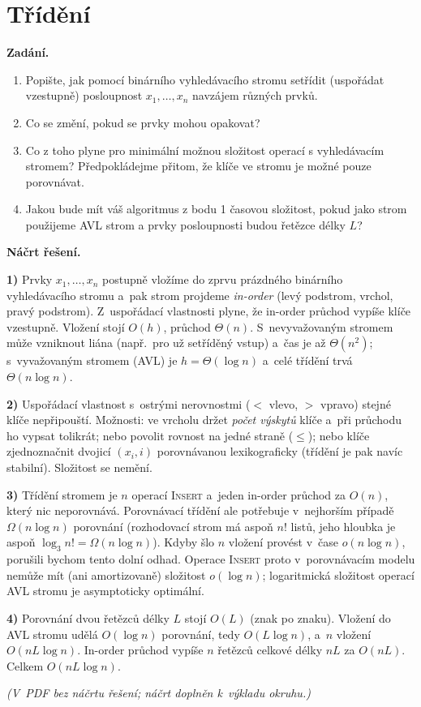 \section{Třídění}

\noindent\textbf{Zadání.}\par
\begin{enumerate}
\item Popište, jak pomocí binárního vyhledávacího stromu setřídit (uspořádat vzestupně)
  posloupnost $x_1, \dots, x_n$ navzájem různých prvků.
\item Co se změní, pokud se prvky mohou opakovat?
\item Co z toho plyne pro minimální možnou složitost operací s vyhledávacím stromem?
  Předpokládejme přitom, že klíče ve stromu je možné pouze porovnávat.
\item Jakou bude mít váš algoritmus z bodu 1 časovou složitost, pokud jako strom použijeme
  AVL strom a prvky posloupnosti budou řetězce délky $L$?
\end{enumerate}

\medskip
\noindent\textbf{Náčrt řešení.}\par
\textbf{1)} Prvky $x_1,\dots,x_n$ postupně vložíme do zprvu prázdného binárního
vyhledávacího stromu a~pak strom projdeme \emph{in-order} (levý podstrom, vrchol, pravý
podstrom). Z~uspořádací vlastnosti plyne, že in-order průchod vypíše klíče vzestupně.
Vložení stojí $O(h)$, průchod $\Theta(n)$. S~nevyvažovaným stromem může vzniknout liána
(např.\ pro už setříděný vstup) a~čas je až $\Theta(n^2)$; s~vyvažovaným stromem (AVL)
je $h=\Theta(\log n)$ a~celé třídění trvá $\Theta(n\log n)$.

\textbf{2)} Uspořádací vlastnost s~ostrými nerovnostmi ($<$ vlevo, $>$ vpravo) stejné
klíče nepřipouští. Možnosti: ve vrcholu držet \emph{počet výskytů} klíče a~při průchodu
ho vypsat tolikrát; nebo povolit rovnost na jedné straně ($\le$); nebo klíče
zjednoznačnit dvojicí $(x_i, i)$ porovnávanou lexikograficky (třídění je pak navíc
stabilní). Složitost se nemění.

\textbf{3)} Třídění stromem je $n$ operací \textsc{Insert} a~jeden in-order průchod za
$O(n)$, který nic neporovnává. Porovnávací třídění ale potřebuje v~nejhorším případě
$\Omega(n\log n)$ porovnání (rozhodovací strom má aspoň $n!$ listů, jeho hloubka je
aspoň $\log_3 n! = \Omega(n\log n)$). Kdyby šlo $n$ vložení provést v~čase
$o(n\log n)$, porušili bychom tento dolní odhad. Operace \textsc{Insert} proto
v~porovnávacím modelu nemůže mít (ani amortizovaně) složitost $o(\log n)$;
logaritmická složitost operací AVL stromu je asymptoticky optimální.

\textbf{4)} Porovnání dvou řetězců délky $L$ stojí $O(L)$ (znak po znaku). Vložení
do AVL stromu udělá $O(\log n)$ porovnání, tedy $O(L\log n)$, a~$n$ vložení
$O(nL\log n)$. In-order průchod vypíše $n$ řetězců celkové délky $nL$ za $O(nL)$.
Celkem $O(nL\log n)$.

\medskip
\textit{(V~PDF bez náčrtu řešení; náčrt doplněn k~výkladu okruhu.)}
